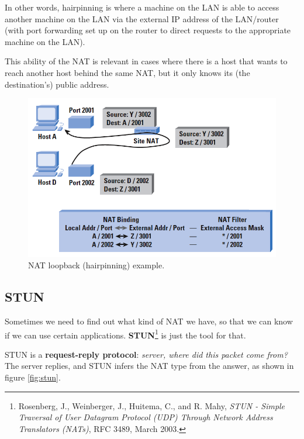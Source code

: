 In other words, hairpinning is where a machine on the LAN is able to access another machine on the LAN via the external IP address of the LAN/router (with port forwarding set up on the router to direct requests to the appropriate machine on the LAN). 

This ability of the NAT is relevant in cases where there is a host that wants to reach another host behind the same NAT, but it only knows its (the destination's) public address.

\begin{figure}[h]
    \centering
    \includegraphics[scale=0.6]{img/hairpin.png}
    \decoRule
    \caption{NAT loopback (hairpinning) example.}
    \label{fig:hairpin}
\end{figure}

\subsection{STUN}
Sometimes we need to find out what kind of NAT we have, so that we can know if we can use certain applications. \textbf{STUN}\footnote{Rosenberg, J., Weinberger, J., Huitema, C., and R. Mahy, \textit{STUN - Simple Traversal of
User Datagram Protocol (UDP) Through Network Address Translators (NATs)}, RFC 3489, March 2003.} is just the tool for that.

STUN is a \textbf{request-reply protocol}: \textit{server, where did this packet come from?} The server replies, and STUN infers the NAT type from the answer, as shown in figure \ref{fig:stun}.

